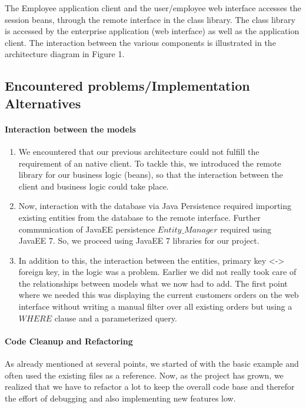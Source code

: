 \documentclass[twoside,colorbacktitle,accentcolor=tud1b]{tudexercise}
\begin{document}
The Employee application client and the user/employee web interface accesses the session beans, through the remote interface in the class library. The class library is accessed by the enterprise application (web interface) as well as the application client. The interaction between the various components is illustrated in the architecture diagram in Figure 1. 

  \subsection{Encountered problems/Implementation Alternatives}
\paragraph{Interaction between the models}
\begin{enumerate} \itemsep1pt \parskip0pt 
\item We encountered that our previous architecture could not fulfill the requirement of an native client.
To tackle this, we introduced the remote library for our business logic (beans), so that the interaction between the client and business logic could take place.
\item  Now, interaction with the database via Java Persistence required importing existing entities from the database to the remote interface.
Further communication of JavaEE persistence $Entity\_Manager$ required using JavaEE 7.
So, we proceed using JavaEE 7 libraries for our project.
\item In addition to this, the interaction between the entities, primary key <-> foreign key, in the logic was a problem. Earlier we did not really took care of the relationships between models what we now had to add. The first point where we needed this was displaying the current customers orders on the web interface without writing a manual filter over all existing orders but using a $WHERE$ clause and a parameterized query. 
\end{enumerate}

\paragraph{Code Cleanup and Refactoring}
As already mentioned at several points, we started of with the basic example and often used the existing files as a reference. Now, as the project has grown, we realized that we have to refactor a lot to keep the overall code base and therefor the effort of debugging and also implementing new features low.
\end{document}
